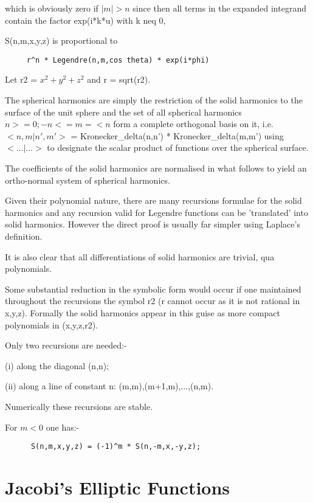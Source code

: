 \documentclass[11pt]{article}
\begin{document}
which is obviously zero if $|m| > n$ since then all terms in the
expanded integrand contain the factor exp(i*k*u) with k neq 0,

S(n,m,x,y,z) is proportional to
\begin{verbatim}
     r^n * Legendre(n,m,cos theta) * exp(i*phi)
\end{verbatim}

Let r2 = $x^2 + y^2 + z^2$ and r = sqrt(r2).

The spherical harmonics are simply the restriction of the solid
harmonics to the surface of the unit sphere and the set of all
spherical harmonics {$n >=0; -n <= m =< n$} form a complete orthogonal
basis on it, i.e. $<n,m|n',m'>$ = Kronecker\_delta(n,n') *
Kronecker\_delta(m,m') using
$<...|...>$ to designate the scalar product
of functions over the spherical surface.

The coefficients of the solid harmonics are normalised in what
follows to yield an ortho-normal system of spherical harmonics.

Given their polynomial nature, there are many recursions formulae
for the solid harmonics and any recursion valid for Legendre functions
can be 'translated' into solid harmonics. However the direct proof is
usually far simpler using Laplace's definition.

It is also clear that all differentiations of solid harmonics are
trivial, qua polynomials.

Some substantial reduction in the symbolic form would occur if one
maintained throughout the recursions the symbol r2 (r cannot occur
as it is not rational in x,y,z). Formally the solid harmonics appear
in this guise as more compact polynomials in (x,y,z,r2).

Only two recursions are needed:-

(i) along the diagonal (n,n);

(ii) along a line of constant n: (m,m),(m+1,m),...,(n,m).

Numerically these recursions are stable.

For $m < 0$ one has:-

\begin{verbatim}
      S(n,m,x,y,z) = (-1)^m * S(n,-m,x,-y,z);
\end{verbatim}

\section{Jacobi's Elliptic Functions}
\end{document}
